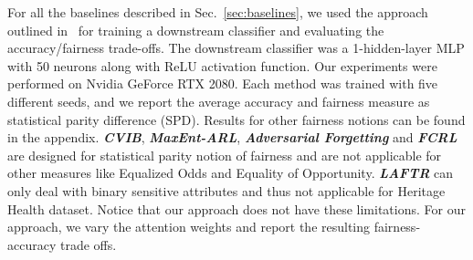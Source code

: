 
For all the  baselines described in Sec.~\ref{sec:baselines}, we used the approach outlined in~\citet{gupta2021controllable} for training a downstream classifier and evaluating the accuracy/fairness trade-offs. The downstream classifier was a 1-hidden-layer MLP with 50 neurons along with ReLU activation function. Our experiments were performed on Nvidia GeForce RTX 2080. Each method was trained with five different seeds, and we report the average accuracy and fairness measure as statistical parity difference (SPD). Results for other fairness notions can be found in the appendix. \textit{\textbf{CVIB}}, \textit{\textbf{MaxEnt-ARL}}, \textit{\textbf{Adversarial Forgetting}} and \textit{\textbf{FCRL}} are designed for statistical parity notion of fairness and are not applicable for other measures like Equalized Odds and Equality of Opportunity.  \textit{\textbf{LAFTR}} can only deal with binary sensitive attributes and thus not applicable for Heritage Health dataset. Notice that our approach does not have these limitations. For our approach, we vary the attention weights and report the resulting fairness-accuracy trade offs. 







